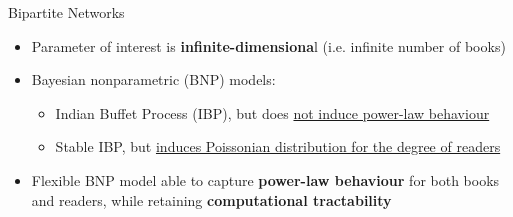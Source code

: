 \documentclass[aspectratio=169,xcolor=dvipsnames]{beamer}
\begin{document}
\begin{frame}{Bipartite Networks}
\begin{center}
    \end{center}
\vspace{5pt}
    \begin{itemize}
        \item<5-> Parameter of interest is \textbf{infinite-dimensiona}l (i.e. infinite number of books)
        \item<6-> Bayesian nonparametric (BNP) models:
        \begin{itemize}
            \item<7->  Indian Buffet Process (IBP), but does \underline{not induce power-law behaviour}
            \item<8->  Stable IBP, but \underline{induces Poissonian distribution for the degree of readers}
        \end{itemize}
        \item<9-> Flexible BNP model able to capture \textbf{power-law behaviour} for both books and readers, while retaining \textbf{computational tractability}
    \end{itemize}

\end{frame}
\end{document}
